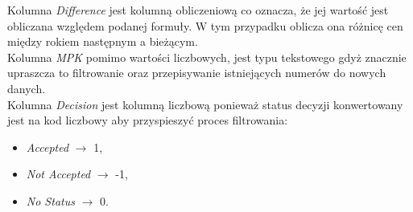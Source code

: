     \noindent Kolumna \emph{Difference} jest kolumną obliczeniową co oznacza, że jej wartość jest obliczana względem podanej formuły. W tym przypadku oblicza ona różnicę cen między rokiem następnym a bieżącym. \\
    Kolumna \emph{MPK} pomimo wartości liczbowych, jest typu tekstowego gdyż znacznie upraszcza to filtrowanie oraz przepisywanie istniejących numerów do nowych danych. \\
    Kolumna \emph{Decision} jest kolumną liczbową ponieważ status decyzji konwertowany jest na kod liczbowy aby przyspieszyć proces filtrowania:
    \begin{itemize}
        \item \emph{Accepted} $\rightarrow$ 1,
        \item \emph{Not Accepted} $\rightarrow$ -1,
        \item \emph{No Status} $\rightarrow$ 0.
    \end{itemize}
    

